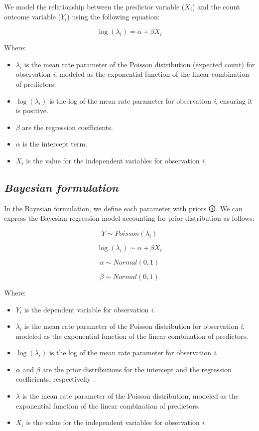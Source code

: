 \documentclass[
  letterpaper,
  DIV=11,
  numbers=noendperiod]{scrreprt}
\begin{document}
We model the relationship between the predictor variable (\(X_i\)) and
the count outcome variable (\(Y_i\)) using the following equation:

\[
\log(\lambda_i) = \alpha + \beta  X_i 
\]

Where:

\begin{itemize}
\item
  \(\lambda_i\) is the mean rate parameter of the Poisson distribution
  (expected count) for observation \emph{i}, modeled as the exponential
  function of the linear combination of predictors.
\item
  \(\log(\lambda_i)\) is the log of the mean rate parameter for
  observation \emph{i}, ensuring it is positive.
\item
  \(\beta\) are the regression coefficients.
\item
  \(\alpha\) is the intercept term.
\item
  \(X_i\) is the value for the independent variables for observation
  \emph{i}.
\end{itemize}

\subsection{\texorpdfstring{\emph{Bayesian
formulation}}{Bayesian formulation}}\label{bayesian-formulation-5}

In the Bayesian formulation, we define each parameter with
\label{prior}{{priors 🛈}}. We can express the Bayesian
regression model accounting for prior distribution as follows:

\[
Y \sim Poisson(\lambda_i)
\]

\[
\log(\lambda_i) \sim \alpha + \beta X_i
\]

\[
\alpha \sim Normal(0, 1)
\]

\[
\beta \sim Normal(0, 1)
\]

Where:

\begin{itemize}
\item
  \(Y_i\) is the dependent variable for observation \emph{i}.
\item
  \(\lambda_i\) is the mean rate parameter of the Poisson distribution
  for observation \emph{i}, modeled as the exponential function of the
  linear combination of predictors.
\item
  \(\log(\lambda_i)\) is the log of the mean rate parameter for
  observation \emph{i}.
\item
  \(\alpha\) and \(\beta\) are the prior distributions for the intercept
  and the regression coefficients, respectivelly .
\item
  \(\lambda\) is the mean rate parameter of the Poisson distribution,
  modeled as the exponential function of the linear combination of
  predictors.
\item
  \(X_i\) is the value for the independent variables for observation
  \emph{i}.
\end{itemize}
\end{document}
